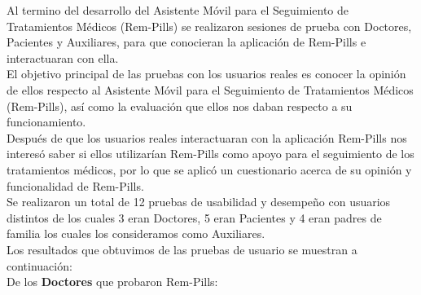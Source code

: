 Al termino del desarrollo del Asistente Móvil para el Seguimiento de Tratamientos Médicos (Rem-Pills) se realizaron sesiones de prueba con Doctores, Pacientes y Auxiliares, para que conocieran la aplicación de Rem-Pills e interactuaran con ella.\\

El objetivo principal de las pruebas con los usuarios reales es conocer la opinión de ellos respecto al Asistente Móvil para el Seguimiento de Tratamientos Médicos (Rem-Pills), así como la evaluación que ellos nos daban respecto a su funcionamiento.\\

Después de que los usuarios reales interactuaran con la aplicación Rem-Pills nos interesó saber si ellos utilizarían Rem-Pills como apoyo para el seguimiento de los tratamientos médicos, por lo que se aplicó un cuestionario acerca de su opinión y funcionalidad de Rem-Pills.\\

Se realizaron un total de 12 pruebas de usabilidad y desempeño con usuarios distintos de los cuales 3 eran Doctores, 5 eran Pacientes y 4 eran padres de familia los cuales los consideramos como Auxiliares.\\

Los resultados que obtuvimos de las pruebas de usuario se muestran a continuación:\\

De los \textbf{Doctores} que probaron Rem-Pills:

